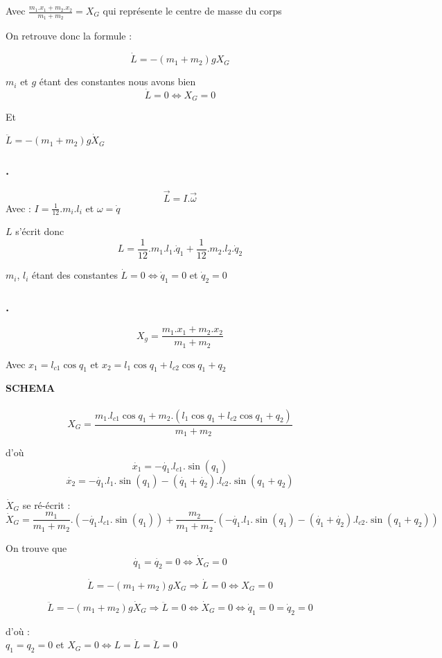 \documentclass[a4paper,12pt]{report}
\begin{document}
Avec $\frac{m_1.x_1 + m_2.x_2}{m_1 + m_2} = X_G$ qui représente le centre de masse du corps

On retrouve donc la formule :

$$\dot{L} = - (m_1 + m_2)g X_G$$

$m_i$ et $g$ étant des constantes nous avons bien
$$\dot{L} = 0 \Leftrightarrow X_G = 0$$

Et

$\ddot{L} = - (m_1 + m_2)g \dot{X}_G$



\subsubsection{.}
\label{subs:}

$$\overrightarrow{L} = I.\overrightarrow{\omega}$$
Avec : $I = \frac{1}{12}.m_i.l_i$ et $\omega = \dot{q}$

$L$ s'écrit donc
$$L = \frac{1}{12}.m_1.l_1.\dot{q}_1 + \frac{1}{12}.m_2.l_2.\dot{q}_2$$

$m_i$, $l_i$ étant des constantes $\dot{L} = 0 \Leftrightarrow \dot{q}_1 = 0$ et $\dot{q}_2 = 0$


\subsubsection{.}
\label{subs:}

$$X_g = \frac{m_1.x_1 + m_2.x_2}{m_1 + m_2}$$

Avec $x_1 = l_{c1} \cos{q_1}$ et $x_2 = l_{1} \cos{q_1} + l_{c2} \cos{q_1 + q_2}$

\textbf{SCHEMA}\\\\

$$X_G = \frac{m_1.l_{c1} \cos{q_1} + m_2.(l_{1} \cos{q_1} + l_{c2} \cos{q_1 + q_2})}{m_1 + m_2}$$

d'où
$$
\dot{x_1} = - \dot{q_1}.l_{c1}.\sin(q_1)
$$
$$
\dot{x_2} = - \dot{q_1}.l_{1}.\sin(q_1) - (\dot{q_1} + \dot{q_2}).l_{c2}.\sin(q_1 + q_2)
$$

$\dot{X}_G$ se ré-écrit :
$$\dot{X}_G = \frac{m_1}{m_1 + m_2}.(- \dot{q_1}.l_{c1}.\sin(q_1)) + \frac{m_2}{m_1 + m_2}.(- \dot{q_1}.l_{1}.\sin(q_1) - (\dot{q_1} + \dot{q_2}).l_{c2}.\sin(q_1 + q_2))$$

On trouve que
$$\dot{q_1} = \dot{q_2} = 0 \Leftrightarrow \dot{X}_G = 0$$

$$
\dot{L} = - (m_1 + m_2)g X_G \Rightarrow \dot{L} = 0 \Leftrightarrow X_G = 0
$$

$$
\ddot{L} = - (m_1 + m_2)g \dot{X}_G \Rightarrow \ddot{L} = 0 \Leftrightarrow \dot{X}_G = 0 \Leftrightarrow \dot{q}_1 = 0 =\dot{q}_2 = 0
$$


d'où : \\
$q_1 = q_2 = 0$ et $X_G = 0 \Leftrightarrow L = \dot{L} = \ddot{L} = 0$
\end{document}
